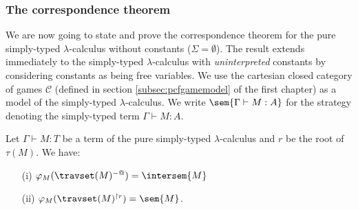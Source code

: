 \subsubsection{The correspondence theorem}
We are now going to state and prove the correspondence theorem
for the pure simply-typed $\lambda$-calculus without constants ($\Sigma = \emptyset$).
The result extends immediately to the simply-typed $\lambda$-calculus with \emph{uninterpreted} constants by
considering constants as being free variables.
We use the cartesian closed category of games $\mathcal{C}$ (defined in section \ref{subsec:pcfgamemodel} of the first chapter) as
a model of the simply-typed $\lambda$-calculus. We write $\sem{\Gamma \vdash M : A}$ for the strategy denoting the simply-typed term
$\Gamma \vdash M : A$.

\begin{prop}
\label{prop:rel_gamesem_trav} Let $\Gamma \vdash M : T$ be a term of
the pure simply-typed $\lambda$-calculus and $r$ be the root of
$\tau(M)$. We have:
\begin{itemize}
\item[(i)]  $\varphi_M(\travset(M)^{-@}) = \intersem{M}$
\item[(ii)] $\varphi_M(\travset(M)^{\upharpoonright r}) = \sem{M}$.
\end{itemize}
\end{prop}


